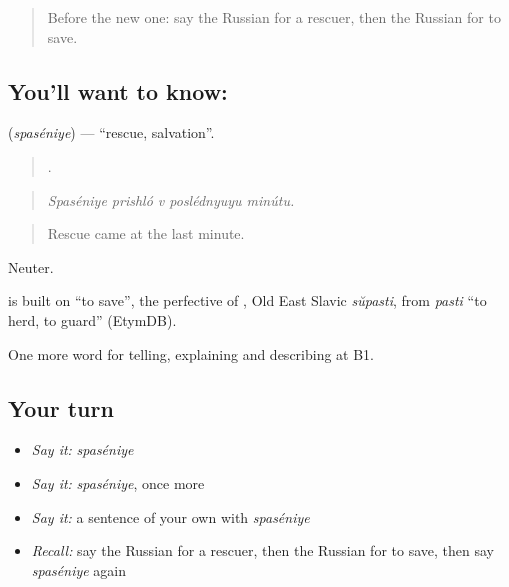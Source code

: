 \label{lesson:RU-C296-spaseniye}



\begin{quote}
Before the new one: say the Russian for a rescuer, then the Russian for to save.
\end{quote}

\subsection*{You'll want to know: }
\textbf{} (\emph{spaséniye}) — \textquotedblleft{}rescue, salvation\textquotedblright{}.

\begin{quote}
    .
\end{quote}

\begin{quote}
\emph{Spaséniye prishló v poslédnyuyu minútu.}
\end{quote}

\begin{quote}
Rescue came at the last minute.
\end{quote}

Neuter.

\begin{cousinweb}
\emph{} is built on \emph{} \textquotedblleft{}to save\textquotedblright{}, the perfective of \emph{}, Old East Slavic \emph{sŭpasti}, from \emph{pasti} \textquotedblleft{}to herd, to guard\textquotedblright{} (EtymDB).
\end{cousinweb}

\begin{grammarlens}[title={What you've built}]
One more word for telling, explaining and describing at B1.
\end{grammarlens}

\subsection*{Your turn}
\begin{itemize}
\raggedright
  \item \emph{Say it:} \emph{spaséniye}
  \item \emph{Say it:} \emph{spaséniye}, once more
  \item \emph{Say it:} a sentence of your own with \emph{spaséniye}
  \item \emph{Recall:} say the Russian for a rescuer, then the Russian for to save, then say \emph{spaséniye} again
\end{itemize}

